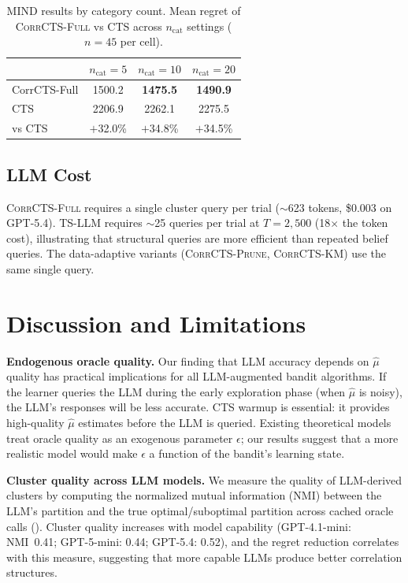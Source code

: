 \documentclass{article}
\theoremstyle{plain}
\theoremstyle{definition}
\theoremstyle{remark}
\newcommand{\CorrFull}{\textsc{CorrCTS-Full}}
\newcommand{\EdgePrune}{\textsc{CorrCTS-Prune}}
\newcommand{\KMRefine}{\textsc{CorrCTS-KM}}
\begin{document}
\begin{table}[t]
\caption{MIND results by category count. Mean regret of \CorrFull{} vs CTS across $n_\text{cat}$ settings ($n = 45$ per cell).}
\label{tab:mind-cats}
\centering
\small
\begin{tabular}{@{}lccc@{}}
\toprule
 & $n_\text{cat}{=}5$ & $n_\text{cat}{=}10$ & $n_\text{cat}{=}20$ \\
\midrule
CorrCTS-Full & 1500.2 & \textbf{1475.5} & \textbf{1490.9} \\
CTS & 2206.9 & 2262.1 & 2275.5 \\
\midrule
vs CTS & $+$32.0\% & $+$34.8\% & $+$34.5\% \\
\bottomrule
\end{tabular}
\end{table}

\subsection{LLM Cost}

\CorrFull{} requires a single cluster query per trial (${\sim}$623 tokens, \$0.003 on GPT-5.4).
TS-LLM requires ${\sim}$25 queries per trial at $T{=}2{,}500$ (18$\times$ the token cost), illustrating that structural queries are more efficient than repeated belief queries.
The data-adaptive variants (\EdgePrune{}, \KMRefine{}) use the same single query.

\section{Discussion and Limitations}\label{sec:discussion}

\textbf{Endogenous oracle quality.}
Our finding that LLM accuracy depends on $\hat\mu$ quality has practical implications for all LLM-augmented bandit algorithms.
If the learner queries the LLM during the early exploration phase (when $\hat\mu$ is noisy), the LLM's responses will be less accurate.
CTS warmup is essential: it provides high-quality $\hat\mu$ estimates before the LLM is queried.
Existing theoretical models treat oracle quality as an exogenous parameter $\epsilon$; our results suggest that a more realistic model would make $\epsilon$ a function of the bandit's learning state.

\textbf{Cluster quality across LLM models.}
We measure the quality of LLM-derived clusters by computing the normalized mutual information (NMI) between the LLM's partition and the true optimal/suboptimal partition across cached oracle calls ().
Cluster quality increases with model capability (GPT-4.1-mini: NMI~0.41; GPT-5-mini: 0.44; GPT-5.4: 0.52), and the regret reduction correlates with this measure, suggesting that more capable LLMs produce better correlation structures.
\end{document}
